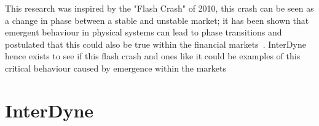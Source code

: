 \documentclass{article}
\begin{document}



This research was inspired by the "Flash Crash" of 2010, this crash can be seen as a change in phase between a stable and unstable market; it has been shown that emergent behaviour in physical systems can lead to phase transitions and postulated that this could also be true within the financial markets~\cite{networkcastphorynature}. InterDyne hence exists to see if this flash crash and ones like it could be examples of this critical behaviour caused by emergence within the markets


\section{InterDyne} 
\end{document}
